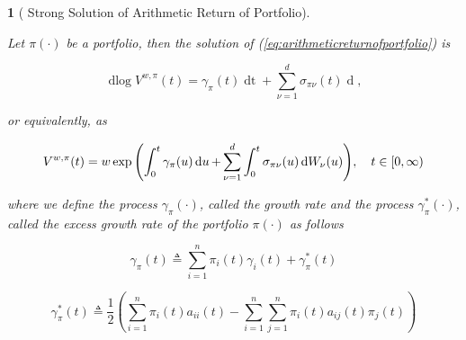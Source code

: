 \documentclass[british]{amsart} \usepackage{lmodern}
\numberwithin{equation}{section} \numberwithin{figure}{section}
\theoremstyle{plain} \newtheorem{thm}{\protect\theoremname}[section]
\theoremstyle{definition} \newtheorem{defn}[thm]{\protect\definitionname}
\theoremstyle{plain} \newtheorem{assumption}[thm]{\protect\assumptionname}
\theoremstyle{plain} \newtheorem{lem}[thm]{\protect\lemmaname}
\theoremstyle{plain} \newtheorem{prop}[thm]{\protect\propositionname}
\theoremstyle{remark} \newtheorem{rem}[thm]{\protect\remarkname}
\theoremstyle{plain} \newtheorem{cor}[thm]{\protect\corollaryname}
\renewcommand{\d}[1]{\mathop{\mathrm{d}{#1}}}
\newcommand{\defeq}{\mathop{\triangleq}} \newcommand{\almostsurely}{\text{a.s.}}
\newcommand{\V}{V^{w,\pi}}
\begin{document}
\begin{prop} [
  {\cite[Equation 1.10]{fernholz2009}} 
  Strong Solution of Arithmetic Return of Portfolio]
  \label{prop:solutionofarithmeticreturnofportfolio}

  Let $\pi(\cdot)$ be a portfolio, then the solution of
  (\ref{eq:arithmeticreturnofportfolio}) is

  \begin{equation}
    \label{eq:solutionofarithmeticreturnofportfoliodiff}
    \d\log{\V(t)} =  
        \gamma_{\pi}(t) \d{t} +
        \sum_{\nu=1}^{d} \sigma_{\pi\nu}(t) \d{W_{\nu}(t)} ,
  \end{equation}

  or equivalently, as

  \begin{equation}
    \label{eq:solutionofarithmeticreturnofportfolio}
    \V(t) = w \exp{ 
      \left(
        \int_{0}^{t} \gamma_{\pi}(u) \d{u} +
        \sum_{\nu=1}^{d} \int_{0}^{t} \sigma_{\pi\nu}(u) \d{W_{\nu}(u)}
      \right)},
  \quad \ranget
  \end{equation}

  where we define the process $\gamma_{\pi}(\cdot)$, called the \textit{growth
  rate} and the process $\gamma_{\pi}^{*}(\cdot)$, called the \textit{excess
  growth rate} of the portfolio $\pi(\cdot)$ as follows

  \begin{equation}
    \label{eq:portfoliogrowthrate}
    \gamma_{\pi}(t) \defeq 
      \sum_{i=1}^{n} \pi_{i}(t)\gamma_{i}(t) + 
      \gamma_{\pi}^{*}(t)
  \end{equation}

  \begin{equation}
    \label{eq:portfolioexcessgrowthrate}
    \gamma_{\pi}^{*}(t) \defeq \frac{1}{2} 
        \left(
          \sum_{i=1}^{n} \pi_{i}(t)a_{ii}(t) -
          \sum_{i=1}^{n} \sum_{j=1}^{n} \pi_{i}(t)a_{ij}(t)\pi_{j}(t)
        \right)
  \end{equation}

\end{prop}
\newcommand{\Valpha}{\V(t)b_{\pi}(t)}
\newcommand{\Vbeta}{\V(t)\sigma_{\pi\nu}(t)}
\newcommand{\VFt}{0}
\newcommand{\VFx}{\frac{1}{\V(t)}}
\newcommand{\VFxx}{-\frac{1}{(\V(t))^2}}
\end{document}
